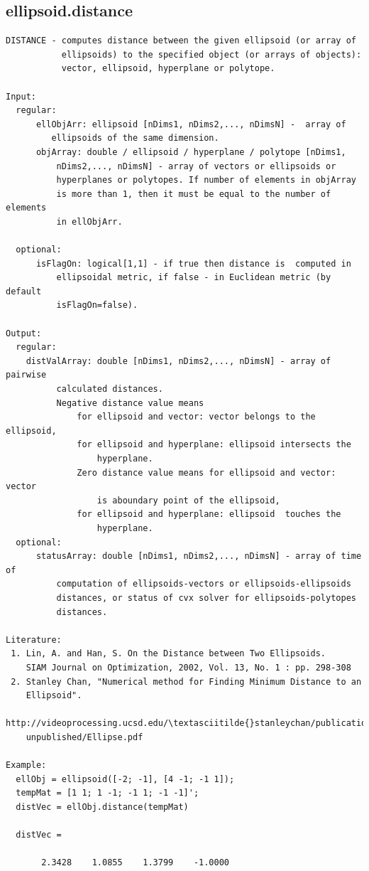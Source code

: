 \documentclass[letterpaper,10pt,english]{sphinxmanual}
\begin{document}
\subsection{ellipsoid.distance}
\label{chap_functions:ellipsoid-distance}
\begin{Verbatim}[commandchars=\\\{\}]
DISTANCE - computes distance between the given ellipsoid (or array of
           ellipsoids) to the specified object (or arrays of objects):
           vector, ellipsoid, hyperplane or polytope.

Input:
  regular:
      ellObjArr: ellipsoid [nDims1, nDims2,..., nDimsN] -  array of
         ellipsoids of the same dimension.
      objArray: double / ellipsoid / hyperplane / polytope [nDims1,
          nDims2,..., nDimsN] - array of vectors or ellipsoids or
          hyperplanes or polytopes. If number of elements in objArray
          is more than 1, then it must be equal to the number of elements
          in ellObjArr.

  optional:
      isFlagOn: logical[1,1] - if true then distance is  computed in
          ellipsoidal metric, if false - in Euclidean metric (by default
          isFlagOn=false).

Output:
  regular:
    distValArray: double [nDims1, nDims2,..., nDimsN] - array of pairwise
          calculated distances.
          Negative distance value means
              for ellipsoid and vector: vector belongs to the ellipsoid,
              for ellipsoid and hyperplane: ellipsoid intersects the
                  hyperplane.
              Zero distance value means for ellipsoid and vector: vector
                  is aboundary point of the ellipsoid,
              for ellipsoid and hyperplane: ellipsoid  touches the
                  hyperplane.
  optional:
      statusArray: double [nDims1, nDims2,..., nDimsN] - array of time of
          computation of ellipsoids-vectors or ellipsoids-ellipsoids
          distances, or status of cvx solver for ellipsoids-polytopes
          distances.

Literature:
 1. Lin, A. and Han, S. On the Distance between Two Ellipsoids.
    SIAM Journal on Optimization, 2002, Vol. 13, No. 1 : pp. 298-308
 2. Stanley Chan, "Numerical method for Finding Minimum Distance to an
    Ellipsoid".
    http://videoprocessing.ucsd.edu/\textasciitilde{}stanleychan/publication/...
    unpublished/Ellipse.pdf

Example:
  ellObj = ellipsoid([-2; -1], [4 -1; -1 1]);
  tempMat = [1 1; 1 -1; -1 1; -1 -1]';
  distVec = ellObj.distance(tempMat)

  distVec =

       2.3428    1.0855    1.3799    -1.0000
\end{Verbatim}
\end{document}
